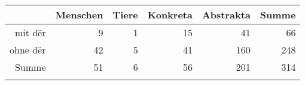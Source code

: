 \begin{tabular}{rrrrrr}
  \lsptoprule
 & Menschen & Tiere & Konkreta & Abstrakta & Summe \\ 
  \midrule
mit dër & 9 & 1 & 15 & 41 & 66 \\ 
  ohne dër & 42 & 5 & 41 & 160 & 248 \\ 
  Summe & 51 & 6 & 56 & 201 & 314 \\ 
   \lspbottomrule
\end{tabular}
